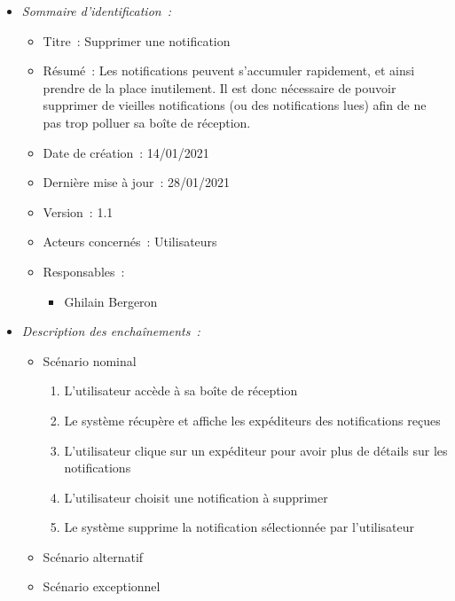 \begin{itemize}

\item \textit{Sommaire d'identification~:}

    \begin{itemize}
    
    \item Titre~: Supprimer une notification
    
    \item Résumé~: Les notifications peuvent s'accumuler rapidement, et ainsi prendre de la place inutilement.
          Il est donc nécessaire de pouvoir supprimer de vieilles notifications (ou des notifications lues) afin de ne pas trop polluer sa boîte de réception.
    
    \item Date de création~: 14/01/2021
    
    \item Dernière mise à jour~: 28/01/2021
    
    \item Version~: 1.1
    
    \item Acteurs concernés~: Utilisateurs
    
    \item Responsables~:
    
        \begin{itemize}
            \item Ghilain Bergeron
        \end{itemize}
    
    \end{itemize}

\item \textit{Description des enchaînements~:}

    \begin{itemize}
        \item Scénario nominal
        \begin{enumerate}
            \item L'utilisateur accède à sa boîte de réception
            \item Le système récupère et affiche les expéditeurs des notifications reçues
            \item L'utilisateur clique sur un expéditeur pour avoir plus de détails sur les notifications
            \item L'utilisateur choisit une notification à supprimer
            \item Le système supprime la notification sélectionnée par l'utilisateur
        \end{enumerate}
        \item Scénario alternatif
        \item Scénario exceptionnel
    \end{itemize}


\end{itemize}

